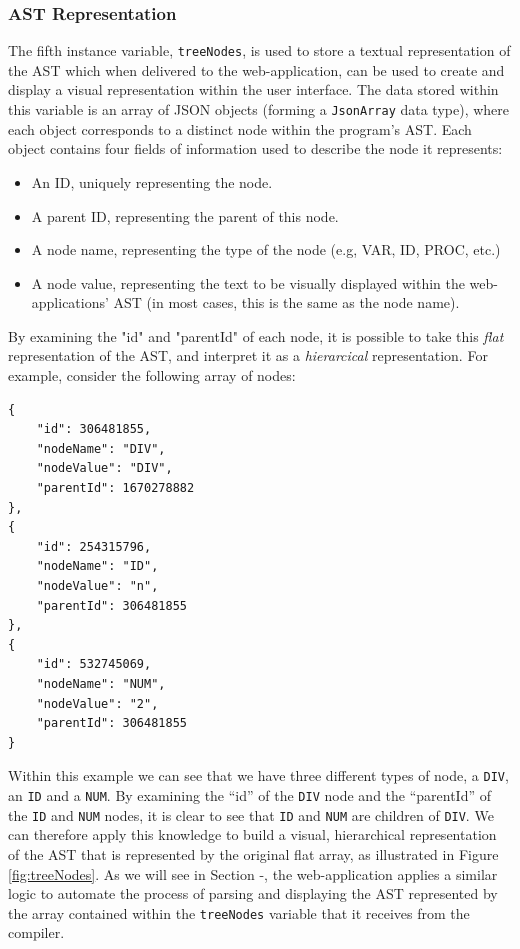 \documentclass{l4proj}
\begin{document}
\subsubsection{AST Representation}
The fifth instance variable, \texttt{treeNodes}, is used to store a textual representation of the AST which when delivered to the web-application, can be used to create and display a visual representation within the user interface. The data stored within this variable is an array of JSON objects (forming a \texttt{JsonArray} data type), where each object corresponds to a distinct node within the program's AST. Each object contains four fields of information used to describe the node it represents:
\begin{itemize}
\item An ID, uniquely representing the node.
\item A parent ID, representing the parent of this node.
\item A node name, representing the type of the node (e.g, VAR, ID, PROC, etc.)
\item A node value, representing the text to be visually displayed within the web-applications' AST (in most cases, this is the same as the node name).
\end{itemize}

By examining the "id" and "parentId" of each node, it is possible to take this \textit{flat} representation of the AST, and interpret it as a \textit{hierarcical} representation. For example, consider the following array of nodes:
\begin{lstlisting}
{
    "id": 306481855,
    "nodeName": "DIV",
    "nodeValue": "DIV",
    "parentId": 1670278882
},
{
    "id": 254315796,
    "nodeName": "ID",
    "nodeValue": "n",
    "parentId": 306481855
},
{
    "id": 532745069,
    "nodeName": "NUM",
    "nodeValue": "2",
    "parentId": 306481855
}
\end{lstlisting}
Within this example we can see that we have three different types of node, a \texttt{DIV}, an \texttt{ID} and a \texttt{NUM}. By examining the ``id'' of the \texttt{DIV} node and the ``parentId'' of the \texttt{ID} and \texttt{NUM} nodes, it is clear to see that \texttt{ID} and \texttt{NUM} are children of \texttt{DIV}. We can therefore apply this knowledge to build a visual, hierarchical representation of the AST that is represented by the original flat array, as illustrated in Figure \ref{fig:treeNodes}. As we will see in Section -, the web-application applies a similar logic to automate the process of parsing and displaying the AST represented by the array contained within the \texttt{treeNodes} variable that it receives from the compiler.
\end{document}
